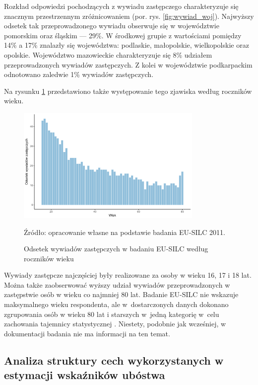 Rozkład odpowiedzi pochodzących z wywiadu zastępczego charakteryzuje się znacznym przestrzennym zróżnicowaniem (por. rys. \ref{fig:wywiad_woj}). Najwyższy odsetek tak przeprowadzonego wywiadu obserwuje się w województwie pomorskim oraz śląskim --- 29\%. W środkowej grupie z wartościami pomiędzy 14\% a 17\% znalazły się województwa: podlaskie, małopolskie, wielkopolskie oraz opolskie. Województwo mazowieckie charakteryzuje się 8\% udziałem przeprowadzonych wywiadów zastępczych. Z kolei w województwie podkarpackim odnotowano zaledwie 1\% wywiadów zastępczych.

Na rysunku \ref{fig:wywiad_wiek} przedstawiono także występowanie tego zjawiska według roczników wieku.

\begin{figure}[ht]
\centering
\includegraphics[width=0.8\textwidth]{04_wykresy/sposob_przeprowadzenia_wywiadu_wiek-1.pdf}
\caption{Odsetek wywiadów zastępczych w badaniu EU-SILC według roczników wieku}
\small{Źródło: opracowanie własne na podstawie badania EU-SILC 2011.}
\label{fig:wywiad_wiek}
\end{figure}

Wywiady zastępcze najczęściej były realizowane za osoby w wieku 16, 17 i 18 lat. Można także zaobserwować wyższy udział wywiadów przeprowadzonych w zastępstwie osób w wieku co najmniej 80 lat. Badanie EU-SILC nie wskazuje maksymalnego wieku respondenta, ale w~dostarczonych danych dokonano zgrupowania osób w wieku 80 lat i starszych w~jedną kategorię w~celu zachowania tajemnicy statystycznej \citep{ciani2011}. Niestety, podobnie jak wcześniej, w dokumentacji badania nie ma informacji na ten temat.

\subsection{Analiza struktury cech wykorzystanych w estymacji wskaźników ubóstwa}\label{pr:struktura-zmiennych}

